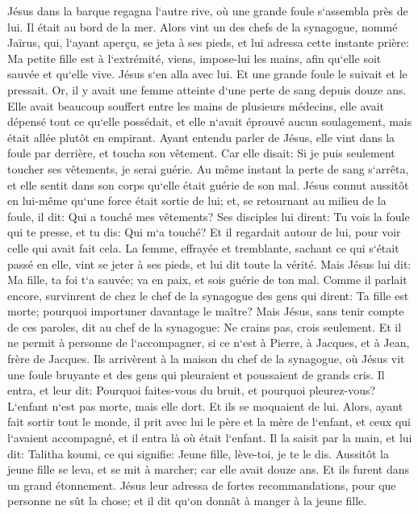 \verse Jésus dans la barque regagna l`autre rive, où une grande foule s`assembla près de lui. Il était au bord de la mer. 
\verse Alors vint un des chefs de la synagogue, nommé Jaïrus, qui, l`ayant aperçu, se jeta à ses pieds, 
\verse et lui adressa cette instante prière: Ma petite fille est à l`extrémité, viens, impose-lui les mains, afin qu`elle soit sauvée et qu`elle vive. 
\verse Jésus s`en alla avec lui. Et une grande foule le suivait et le pressait. 
\verse Or, il y avait une femme atteinte d`une perte de sang depuis douze ans. 
\verse Elle avait beaucoup souffert entre les mains de plusieurs médecins, elle avait dépensé tout ce qu`elle possédait, et elle n`avait éprouvé aucun soulagement, mais était allée plutôt en empirant. 
\verse Ayant entendu parler de Jésus, elle vint dans la foule par derrière, et toucha son vêtement. 
\verse Car elle disait: Si je puis seulement toucher ses vêtements, je serai guérie. 
\verse Au même instant la perte de sang s`arrêta, et elle sentit dans son corps qu`elle était guérie de son mal. 
\verse Jésus connut aussitôt en lui-même qu`une force était sortie de lui; et, se retournant au milieu de la foule, il dit: Qui a touché mes vêtements? 
\verse Ses disciples lui dirent: Tu vois la foule qui te presse, et tu dis: Qui m`a touché? 
\verse Et il regardait autour de lui, pour voir celle qui avait fait cela. 
\verse La femme, effrayée et tremblante, sachant ce qui s`était passé en elle, vint se jeter à ses pieds, et lui dit toute la vérité. 
\verse Mais Jésus lui dit: Ma fille, ta foi t`a sauvée; va en paix, et sois guérie de ton mal. 
\verse Comme il parlait encore, survinrent de chez le chef de la synagogue des gens qui dirent: Ta fille est morte; pourquoi importuner davantage le maître? 
\verse Mais Jésus, sans tenir compte de ces paroles, dit au chef de la synagogue: Ne crains pas, crois seulement. 
\verse Et il ne permit à personne de l`accompagner, si ce n`est à Pierre, à Jacques, et à Jean, frère de Jacques. 
\verse Ils arrivèrent à la maison du chef de la synagogue, où Jésus vit une foule bruyante et des gens qui pleuraient et poussaient de grands cris. 
\verse Il entra, et leur dit: Pourquoi faites-vous du bruit, et pourquoi pleurez-vous? L`enfant n`est pas morte, mais elle dort. 
\verse Et ils se moquaient de lui. Alors, ayant fait sortir tout le monde, il prit avec lui le père et la mère de l`enfant, et ceux qui l`avaient accompagné, et il entra là où était l`enfant. 
\verse Il la saisit par la main, et lui dit: Talitha koumi, ce qui signifie: Jeune fille, lève-toi, je te le dis. 
\verse Aussitôt la jeune fille se leva, et se mit à marcher; car elle avait douze ans. Et ils furent dans un grand étonnement. 
\verse Jésus leur adressa de fortes recommandations, pour que personne ne sût la chose; et il dit qu`on donnât à manger à la jeune fille. 

